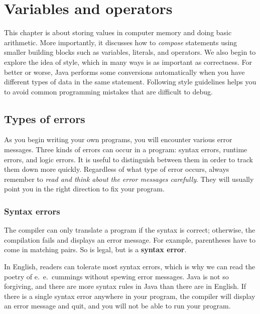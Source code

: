 \chapter{Variables and operators}

This chapter is about storing values in computer memory and doing basic arithmetic.
More importantly, it discusses how to {\em compose} statements using smaller building blocks such as variables, literals, and operators.
We also begin to explore the idea of style, which in many ways is as important as correctness.
For better or worse, Java performs some conversions automatically when you have different types of data in the same statement.
Following style guidelines helps you to avoid common programming mistakes that are difficult to debug.


\section{Types of errors}


As you begin writing your own programs, you will encounter various error messages.
Three kinds of errors can occur in a program: syntax errors, runtime errors, and logic errors.
It is useful to distinguish between them in order to track them down more quickly.
Regardless of what type of error occurs, always remember to {\em read and think about the error messages carefully}.
They will usually point you in the right direction to fix your program.

\subsection{Syntax errors}


The compiler can only translate a program if the syntax is correct; otherwise, the compilation fails and displays an error message.
For example, parentheses have to come in matching pairs.
So  is legal, but  is a {\bf syntax error}.

In English, readers can tolerate most syntax errors, which is why we can read the poetry of e.\ e.\ cummings without spewing error messages.
Java is not so forgiving, and there are more syntax rules in Java than there are in English.
If there is a single syntax error anywhere in your program, the compiler will display an error message and quit, and you will not be able to run your program.

